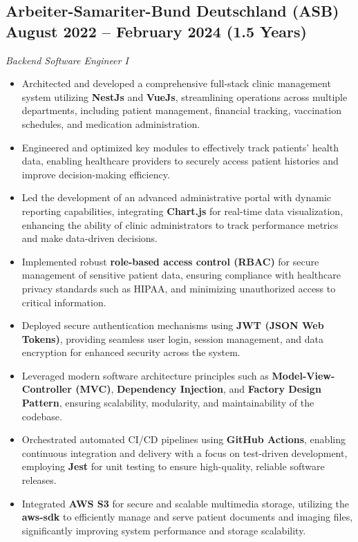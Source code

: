 \documentclass[a4paper,10pt]{article}
\begin{document}
\subsection*{Arbeiter-Samariter-Bund Deutschland (ASB) \hfill August 2022 – February 2024 (1.5 Years)}
\textit{Backend Software Engineer I}
\begin{itemize}
    \item Architected and developed a comprehensive full-stack clinic management system utilizing \textbf{NestJs} and \textbf{VueJs}, streamlining operations across multiple departments, including patient management, financial tracking, vaccination schedules, and medication administration.
    \item Engineered and optimized key modules to effectively track patients' health data, enabling healthcare providers to securely access patient histories and improve decision-making efficiency.
    \item Led the development of an advanced administrative portal with dynamic reporting capabilities, integrating \textbf{Chart.js} for real-time data visualization, enhancing the ability of clinic administrators to track performance metrics and make data-driven decisions.
    \item Implemented robust \textbf{role-based access control (RBAC)} for secure management of sensitive patient data, ensuring compliance with healthcare privacy standards such as HIPAA, and minimizing unauthorized access to critical information.
    \item Deployed secure authentication mechanisms using \textbf{JWT (JSON Web Tokens)}, providing seamless user login, session management, and data encryption for enhanced security across the system.
    \item Leveraged modern software architecture principles such as \textbf{Model-View-Controller (MVC)}, \textbf{Dependency Injection}, and \textbf{Factory Design Pattern}, ensuring scalability, modularity, and maintainability of the codebase.
    \item Orchestrated automated CI/CD pipelines using \textbf{GitHub Actions}, enabling continuous integration and delivery with a focus on test-driven development, employing \textbf{Jest} for unit testing to ensure high-quality, reliable software releases.
    \item Integrated \textbf{AWS S3} for secure and scalable multimedia storage, utilizing the \textbf{aws-sdk} to efficiently manage and serve patient documents and imaging files, significantly improving system performance and storage scalability.
\end{itemize}
\end{document}
